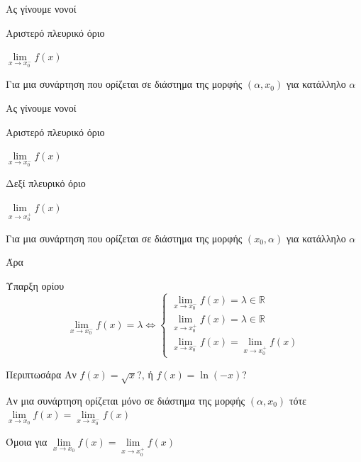 \documentclass[greek]{beamer}
\begin{document}
\begin{frame}{Ας γίνουμε νονοί}
 \begin{block}{Αριστερό πλευρικό όριο}
  \begin{center}
   $\lim\limits_{x \to x_0^-}{ f(x) }$ \pause
  \end{center}

  Για μια συνάρτηση που ορίζεται σε διάστημα της μορφής $(α,x_0)$ για κατάλληλο $α$
 \end{block}
\end{frame}

\begin{frame}{Ας γίνουμε νονοί}
 \begin{block}{Αριστερό πλευρικό όριο}
  \begin{center}
   $\lim\limits_{x \to x_0^-}{ f(x) }$ \pause
  \end{center}
 \end{block}
 \begin{block}{Δεξί πλευρικό όριο}
  \begin{center}
   $\lim\limits_{x \to x_0^+}{ f(x) }$ \pause
  \end{center}

  Για μια συνάρτηση που ορίζεται σε διάστημα της μορφής $(x_0,α)$ για κατάλληλο $α$
 \end{block}
\end{frame}

\begin{frame}{Άρα}
 \begin{block}{Ύπαρξη ορίου}
  \begin{equation*}
   \lim\limits_{x \to x_0^-}{ f(x) }=λ\iff
   \begin{cases}
    \lim\limits_{x \to x_0^-}{ f(x) }=λ\in\mathbb{R} \\
    \lim\limits_{x \to x_0^+}{ f(x) }=λ\in\mathbb{R} \\
    \lim\limits_{x \to x_0^-}{ f(x) }=\lim\limits_{x \to x_0^+}{ f(x) }
   \end{cases}
  \end{equation*}
 \end{block}
\end{frame}

\begin{frame}{Περιπτωσάρα}
 Αν $f(x)=\sqrt{x}$?, ή $f(x)=\ln (-x)$? \pause
 \begin{block}{ }
  Αν μια συνάρτηση ορίζεται μόνο σε διάστημα της μορφής $(α,x_0)$ τότε $\lim\limits_{x \to x_0}{ f(x) }=\lim\limits_{x \to x_0^-}{ f(x) }$
 \end{block} \pause
 Όμοια για $\lim\limits_{x \to x_0}{ f(x) }=\lim\limits_{x \to x_0^+}{ f(x) }$
\end{frame}
\end{document}
